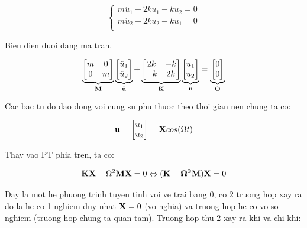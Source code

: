 \begin{equation}\label{eq_PT2dofs}
    \begin{cases}
        m \ddot{u}_1 + 2ku_1 - ku_2 = 0 \\
        m \ddot{u}_2 + 2ku_2 - ku_1 = 0 \\
    \end{cases}
\end{equation}

Bieu dien duoi dang ma tran.

\begin{equation}\label{eq_PTmatrix}
    \underbrace{\begin{bmatrix}
        m & 0\\ 0 & m
    \end{bmatrix}}_{\bf M}\underbrace{\begin{bmatrix}
        \ddot{u}_1 \\ \ddot{u}_2
    \end{bmatrix}}_{\ddot{\bf u}} +\underbrace{\begin{bmatrix}
        2k & -k \\ -k & 2k
    \end{bmatrix}}_{\bf K} \underbrace{\begin{bmatrix}
        u_1 \\ u_2
    \end{bmatrix}}_{\bf u} = \underbrace{\begin{bmatrix}
        0 \\ 0
    \end{bmatrix}}_{\bf O} 
\end{equation}

Cac bac tu do dao dong voi cung su phu thuoc theo thoi gian nen chung ta co:

\begin{equation}
    {\bf u} = \begin{bmatrix}
        u_1 \\ u_2
    \end{bmatrix} = {\bf X}cos(\Omega t)
\end{equation}

Thay vao PT phia tren, ta co:

\begin{equation}
    {\bf K}{\bf X} - \Omega^2{\bf M}{\bf X} = 0 \Leftrightarrow ({\bf K-\Omega^2{\bf M}}){\bf X} = 0
\end{equation}

Day la mot he phuong trinh tuyen tinh voi ve trai bang 0, co 2 truong hop xay ra do la he co 1 nghiem duy nhat ${\bf X} =0$ (vo nghia) va truong hop he co vo so nghiem (truong hop chung ta quan tam). Truong hop thu 2 xay ra khi va chi khi:

